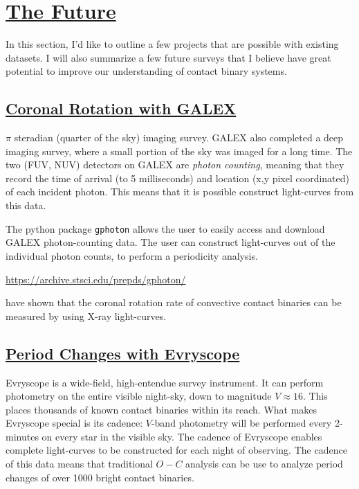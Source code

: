 \documentclass[12pt]{article} %
\numberwithin{equation}{section} %
\begin{document}
\citep{bradstreet1988mapping}


\section[The Future]{\hyperlink{toc}{The Future}} \label{sec: The Future}

In this section, I'd like to outline a few projects that are possible with existing datasets. I will also summarize a few future surveys that I believe have great potential to improve our understanding of contact binary systems.

\subsection[Coronal Rotation with GALEX]{\hyperlink{toc}{Coronal Rotation with GALEX}}

$\pi$ steradian (quarter of the sky) imaging survey. GALEX also completed a deep imaging survey, where a small portion of the sky was imaged for a long time. The two (FUV, NUV) detectors on GALEX are \emph{photon counting}, meaning that they record the time of arrival (to 5 milliseconds) and location (x,y pixel coordinated) of each incident photon. This means that it is possible construct light-curves from this data.

The python package \texttt{gphoton} allows the user to easily access and download GALEX photon-counting data. The user can construct light-curves out of the individual photon counts, to perform a periodicity analysis.

\url{https://archive.stsci.edu/prepds/gphoton/}

\citet{mccale1996rosat} have shown that the coronal rotation rate of convective contact binaries can be measured by using X-ray light-curves.

\subsection[Period Changes with Evryscope]{\hyperlink{toc}{Period Changes with Evryscope}}

Evryscope is a wide-field, high-entendue survey instrument. It can perform photometry on the entire visible night-sky, down to magnitude $V \approx 16$. This places thousands of known contact binaries within its reach. What makes Evryscope special is its cadence: $V$-band photometry will be performed every 2-minutes on every star in the visible sky. The cadence of Evryscope enables complete light-curves to be constructed for each night of observing. The cadence of this data means that traditional $O - C$ analysis can be use to analyze period changes of over 1000 bright contact binaries.  
\end{document}

